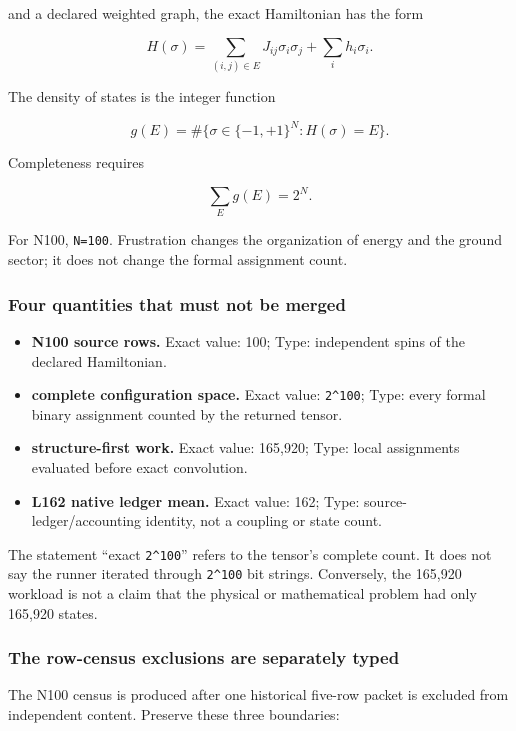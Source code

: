and a declared weighted graph, the exact Hamiltonian has the form

\[
H(\sigma)
=\sum_{(i,j)\in E}J_{ij}\sigma_i\sigma_j
+\sum_i h_i\sigma_i.
\]

The density of states is the integer function

\[
g(E)=\#\{\sigma\in\{-1,+1\}^N:H(\sigma)=E\}.
\]

Completeness requires

\[
\sum_Eg(E)=2^N.
\]

For N100, \texttt{N=100}. Frustration changes the organization of energy
and the ground sector; it does not change the formal assignment count.

\subsubsection{Four quantities that must not be
merged}\label{viii-ch01-four-quantities-that-must-not-be-merged}

\begin{itemize}
\tightlist
\item
  \textbf{N100 source rows.} Exact value: 100; Type: independent spins
  of the declared Hamiltonian.
\item
  \textbf{complete configuration space.} Exact value: \texttt{2\^{}100};
  Type: every formal binary assignment counted by the returned tensor.
\item
  \textbf{structure-first work.} Exact value: 165,920; Type: local
  assignments evaluated before exact convolution.
\item
  \textbf{L162 native ledger mean.} Exact value: 162; Type:
  source-ledger/accounting identity, not a coupling or state count.
\end{itemize}

The statement ``exact \texttt{2\^{}100}'' refers to the tensor's
complete count. It does not say the runner iterated through
\texttt{2\^{}100} bit strings. Conversely, the 165,920 workload is not a
claim that the physical or mathematical problem had only 165,920 states.

\subsubsection{The row-census exclusions are separately
typed}\label{viii-ch01-the-row-census-exclusions-are-separately-typed}

The N100 census is produced after one historical five-row packet is
excluded from independent content. Preserve these three boundaries:

